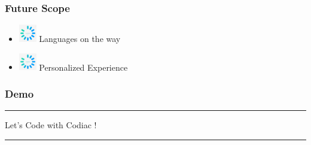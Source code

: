 \documentclass[14pt]{beamer}
\begin{document}
\begin{frame}
    \frametitle{Future Scope}
	\noindent                                                                                                       {\color{pink} \rule{\linewidth}{0.7mm}} 
         \begin{itemize}
 \item [] \includegraphics[width=0.3in, height=0.3in]{./Codiac/logos/loading.jpg} Languages on the way\\
     \pause
 \item [] \includegraphics[width=0.3in, height=0.3in]{./Codiac/logos/loading.jpg} Personalized Experience \\
 \end{itemize}
\noindent{	
	   \color{pink} \rule{\linewidth}{0.7mm} }   	
\end{frame}	


\begin{frame}
	\frametitle{Demo}
    {\color{dr} \rule{\linewidth}{0.7mm}}
    \linebreak
    \linebreak
    \centerline
    {\huge \color{dr}
    Let's Code with Codiac !}
    \linebreak

    {\color{dr} \rule{\linewidth}{0.7mm}}
\end{frame}
\end{document}
